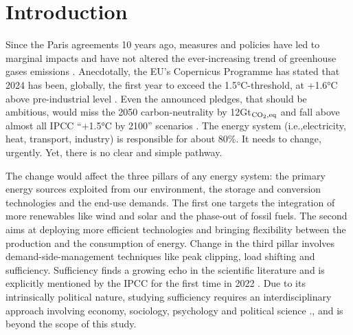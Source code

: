 \documentclass[11pt,twoside,a4paper,english]{article}
\def\ie{i.e.,}
\begin{document}
\section{Introduction}
\label{sec:intro}
Since the Paris agreements 10 years ago, measures and policies have led to marginal impacts and have not altered the ever-increasing trend of greenhouse gases emissions \cite{ourwold_CO2}. Anecdotally, the EU’s Copernicus Programme has stated that 2024 has been, globally, the first year to exceed the 1.5°C-threshold, at +1.6°C above pre-industrial level \cite{Copernicus_2024}. Even the announced pledges, that should be ambitious, would miss the 2050 carbon-neutrality by 12Gt$_{\ce{CO2},\text{eq}}$ and fall above almost all IPCC ``+1.5$°$C by 2100'' scenarios \cite{IEA_APS}. The energy system (\ie electricity, heat, transport, industry) is responsible for about 80\%. It needs to change, urgently. Yet, there is no clear and simple pathway.

The change would affect the three pillars of any energy system: the primary energy sources exploited from our environment, the storage and conversion technologies and the end-use demands. The first one targets the integration of more renewables like wind and solar and the phase-out of fossil fuels. The second aims at deploying more efficient technologies and bringing flexibility between the production and the consumption of energy. Change in the third pillar involves demand-side-management techniques like peak clipping, load shifting \cite{bakare2023comprehensive} and sufficiency. Sufficiency finds a growing echo in the scientific literature \cite{o2018good,wiese2024key} and is explicitly mentioned by the IPCC for the first time in 2022 \cite{IPCC2022}. Due to its intrinsically political nature, studying sufficiency requires an interdisciplinary approach involving economy, sociology, psychology and political science \cite{schmidt2015interdisciplinary}., and is beyond the scope of this study. 
\end{document}
